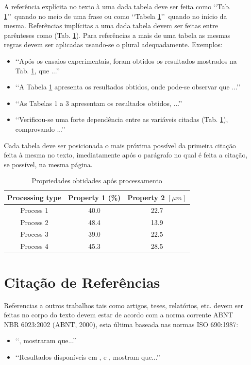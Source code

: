 A referência explícita no texto à uma dada tabela deve ser feita como 
\lq\lq Tab. \ref{tab01}\rq\rq\ quando no meio de uma frase ou como 
\lq\lq Tabela \ref{tab01}\rq\rq\ quando no início da mesma. Referências 
implícitas a uma dada tabela devem ser feitas entre parênteses como 
(Tab. \ref{tab01}). Para referências a mais de uma tabela as mesmas 
regras devem ser aplicadas usando-se o plural adequadamente. Exemplos:
\begin{itemize}
	\item \lq\lq Após os ensaios experimentais, foram obtidos os resultados 
	mostrados na Tab. \ref{tab01}, que ...\rq\rq
	\item \lq\lq A Tabela \ref{tab01} apresenta os resultados obtidos, onde 
	pode-se observar que ...\rq\rq
	\item \lq\lq As Tabelas 1 a 3 apresentam os resultados obtidos, ...\rq\rq
	\item \lq\lq Verificou-se uma forte dependência entre as variáveis citadas 
	(Tab. \ref{tab01}), comprovando ...\rq\rq
\end{itemize}

Cada tabela deve ser posicionada o mais próxima possível da primeira citação 
feita à mesma no texto, imediatamente após o parágrafo no qual é feita a 
citação, se possível, na mesma página.

\begin{table}[h]
	\centering
	\caption{Propriedades obtidades após processamento}
	\label{tab01}
	
	\begin{tabular}{ccc}
		\toprule
		\textbf{Processing type} & \textbf{Property 1} (\%) & 
		\textbf{Property 2} $[\mu m]$ \\
		\midrule
		Process 1 & 40.0 & 22.7 \\
		Process 2 & 48.4 & 13.9 \\
		Process 3 & 39.0 & 22.5 \\
		Process 4 & 45.3 & 28.5 \\
		\bottomrule
	\end{tabular}
\end{table}

\section{Citação de Referências}

Referencias a outros trabalhos tais como artigos, teses, relatórios, etc. devem 
ser feitas no corpo do texto devem estar de acordo com a norma corrente ABNT 
NBR 6023:2002 (ABNT, 2000), esta última baseada nas normas ISO 690:1987:
\begin{itemize}
	\item \lq\lq {}, mostraram que...\rq\rq

	\item \lq\lq Resultados disponíveis em \cite{coimbra1978}, \cite{clark1986} 
	e \cite{sparrow1980}, mostram que...\rq\rq
\end{itemize}

